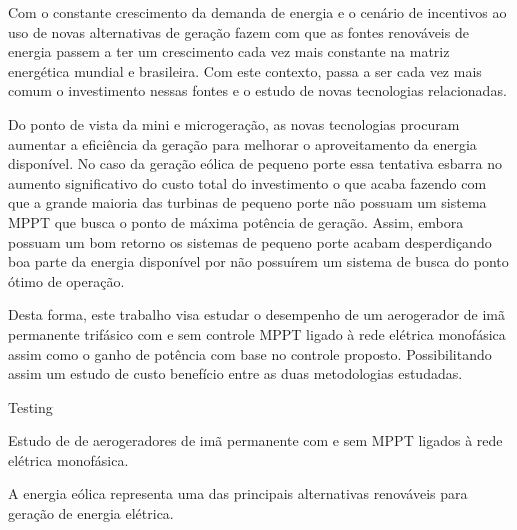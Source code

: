 Com o constante crescimento da demanda de energia e o cenário de incentivos ao uso de novas alternativas de geração fazem com que as fontes renováveis de energia passem a ter um crescimento cada vez mais constante na matriz energética mundial e brasileira. Com este contexto, passa a ser cada vez mais comum o investimento nessas fontes e o estudo de novas tecnologias relacionadas.

Do ponto de vista da mini e microgeração, as novas tecnologias procuram aumentar a eficiência da geração para melhorar o aproveitamento da energia disponível. No caso da geração eólica de pequeno porte essa tentativa esbarra no aumento significativo do custo total do investimento o que acaba fazendo com que a grande maioria das turbinas de pequeno porte não possuam um sistema MPPT que busca o ponto de máxima potência de geração. Assim, embora possuam um bom retorno os sistemas de pequeno porte acabam desperdiçando boa parte da energia disponível por não possuírem um sistema de busca do ponto ótimo de operação.

Desta forma, este trabalho visa estudar o desempenho de um aerogerador de imã permanente trifásico com e sem controle MPPT ligado à rede elétrica monofásica assim como o ganho de potência com base no controle proposto. Possibilitando assim um estudo de custo benefício entre as duas metodologias estudadas.


Testing




    Estudo de de aerogeradores de imã permanente com e sem MPPT ligados à rede elétrica monofásica.
    
    A energia eólica representa uma das principais alternativas renováveis para geração de
    energia elétrica. 
    


